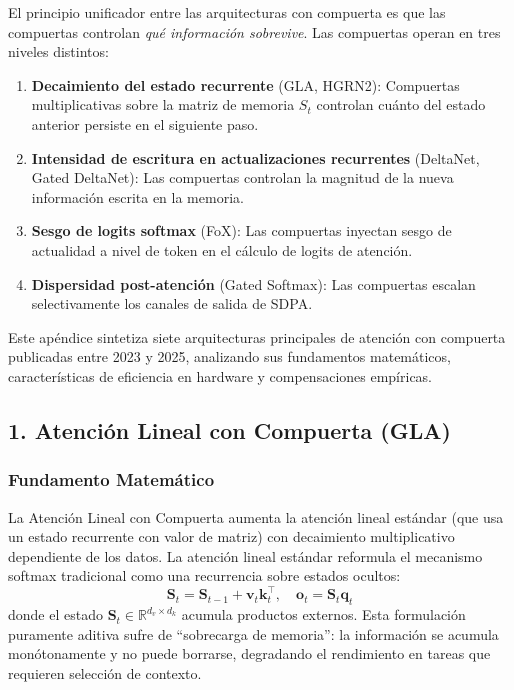 \documentclass[11pt,a4paper]{article}
\begin{document}
El principio unificador entre las arquitecturas con compuerta es que las compuertas controlan \textit{qué información sobrevive}. Las compuertas operan en tres niveles distintos:
\begin{enumerate}[leftmargin=*]
    \item \textbf{Decaimiento del estado recurrente} (GLA, HGRN2): Compuertas multiplicativas sobre la matriz de memoria $S_t$ controlan cuánto del estado anterior persiste en el siguiente paso.
    \item \textbf{Intensidad de escritura en actualizaciones recurrentes} (DeltaNet, Gated DeltaNet): Las compuertas controlan la magnitud de la nueva información escrita en la memoria.
    \item \textbf{Sesgo de logits softmax} (FoX): Las compuertas inyectan sesgo de actualidad a nivel de token en el cálculo de logits de atención.
    \item \textbf{Dispersidad post-atención} (Gated Softmax): Las compuertas escalan selectivamente los canales de salida de SDPA.
\end{enumerate}

Este apéndice sintetiza siete arquitecturas principales de atención con compuerta publicadas entre 2023 y 2025, analizando sus fundamentos matemáticos, características de eficiencia en hardware y compensaciones empíricas.

\subsection{1. Atención Lineal con Compuerta (GLA)}

\subsubsection{Fundamento Matemático}

La Atención Lineal con Compuerta \citep{yang_gla_2023} aumenta la atención lineal estándar (que usa un estado recurrente con valor de matriz) con decaimiento multiplicativo dependiente de los datos. La atención lineal estándar reformula el mecanismo softmax tradicional como una recurrencia sobre estados ocultos:
\[
\mathbf{S}_t = \mathbf{S}_{t-1} + \mathbf{v}_t \mathbf{k}_t^\top, \quad \mathbf{o}_t = \mathbf{S}_t \mathbf{q}_t
\]
donde el estado $\mathbf{S}_t \in \mathbb{R}^{d_v \times d_k}$ acumula productos externos. Esta formulación puramente aditiva sufre de ``sobrecarga de memoria'': la información se acumula monótonamente y no puede borrarse, degradando el rendimiento en tareas que requieren selección de contexto.
\end{document}
